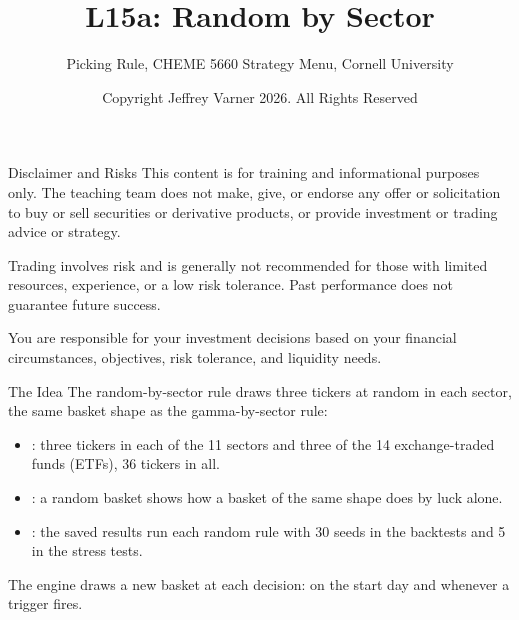 \documentclass[aspectratio=169,11pt]{beamer}
\title{\texorpdfstring{{\vnheavy L15a}}{L15a}: Random by Sector}
\subtitle{Picking Rule, CHEME 5660 Strategy Menu, Cornell University}
\author{Copyright Jeffrey Varner 2026. All Rights Reserved}
\begin{document}
\vntitlepage

\begin{frame}{Disclaimer and Risks}
  \vspace{0.6em}
  \textbf{} This content is for training and informational
  purposes only. The teaching team does not make, give, or endorse any offer or
  solicitation to buy or sell securities or derivative products, or provide
  investment or trading advice or strategy.

  \vspace{1.1em}
  \textbf{} Trading involves risk and is generally not recommended for
  those with limited resources, experience, or a low risk tolerance. Past
  performance does not guarantee future success.

  \vspace{1.1em}
  \textbf{} You are responsible for your investment decisions
  based on your financial circumstances, objectives, risk tolerance, and
  liquidity needs.
\end{frame}

\begin{frame}{The Idea}
  \vspace{0.3em}
  The random-by-sector rule draws three tickers at random in each sector, the same basket shape as the
  gamma-by-sector rule:
  \begin{itemize}\setlength{\itemsep}{0.5em}
    \item {}: three tickers in each of the 11 sectors and three of the 14 exchange-traded funds (ETFs), 36 tickers in all.
    \item {}: a random basket shows how a basket of the same shape does by luck alone.
    \item {}: the saved results run each random rule with 30 seeds in the backtests and 5 in the stress tests.
  \end{itemize}

  \vspace{0.5em}
  The engine draws a new basket at each decision: on the start day and whenever a trigger fires.
\end{frame}
\end{document}

